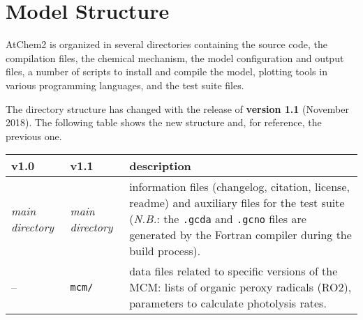 \chapter{Model Structure}

AtChem2 is organized in several directories containing the source code,
the compilation files, the chemical mechanism, the model configuration
and output files, a number of scripts to install and compile the model,
plotting tools in various programming languages, and the test suite
files.

The directory structure has changed with the release of \textbf{version
1.1} (November 2018). The following table shows the new structure and,
for reference, the previous one.

\begin{longtable}[]{@{}lll@{}}
\begin{minipage}[b]{0.20\columnwidth}\raggedright
v1.0\strut
\end{minipage} & \begin{minipage}[b]{0.24\columnwidth}\raggedright
v1.1\strut
\end{minipage} & \begin{minipage}[b]{0.48\columnwidth}\raggedright
description\strut
\end{minipage}\tabularnewline
\endhead
\begin{minipage}[t]{0.20\columnwidth}\raggedright
\emph{main directory}\strut
\end{minipage} & \begin{minipage}[t]{0.24\columnwidth}\raggedright
\emph{main directory}\strut
\end{minipage} & \begin{minipage}[t]{0.48\columnwidth}\raggedright
information files (changelog, citation, license, readme) and auxiliary
files for the test suite (\emph{N.B.}: the \texttt{.gcda} and
\texttt{.gcno} files are generated by the Fortran compiler during the
build process).\strut
\end{minipage}\tabularnewline
\begin{minipage}[t]{0.20\columnwidth}\raggedright
--\strut
\end{minipage} & \begin{minipage}[t]{0.24\columnwidth}\raggedright
\texttt{mcm/}\strut
\end{minipage} & \begin{minipage}[t]{0.48\columnwidth}\raggedright
data files related to specific versions of the MCM: lists of organic
peroxy radicals (RO2), parameters to calculate photolysis rates.\strut

\end{minipage}
\end{longtable}

